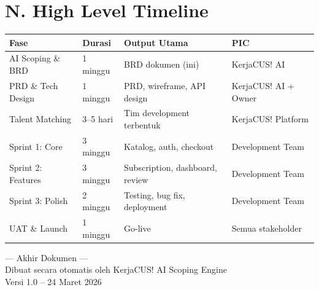 \documentclass[11pt,a4paper]{article}
\begin{document}
\section{N. High Level Timeline}
\noindent\small
\begin{tabularx}{\textwidth}{|p{3.2cm}|p{1.8cm}|X|p{2.8cm}|}
\hline
\centering\textbf{Fase}\arraybackslash & \centering\textbf{Durasi}\arraybackslash & \centering\textbf{Output Utama}\arraybackslash & \centering\textbf{PIC}\arraybackslash \\\hline
AI Scoping \& BRD & 1 minggu & BRD dokumen (ini) & KerjaCUS! AI \\\hline
PRD \& Tech Design & 1 minggu & PRD, wireframe, API design & KerjaCUS! AI + Owner \\\hline
Talent Matching & 3--5 hari & Tim development terbentuk & KerjaCUS! Platform \\\hline
Sprint 1: Core & 3 minggu & Katalog, auth, checkout & Development Team \\\hline
Sprint 2: Features & 3 minggu & Subscription, dashboard, review & Development Team \\\hline
Sprint 3: Polish & 2 minggu & Testing, bug fix, deployment & Development Team \\\hline
UAT \& Launch & 1 minggu & Go-live & Semua stakeholder \\\hline
\end{tabularx}\normalsize

\vspace{1.5cm}
\begin{center}\small
--- Akhir Dokumen ---\\
Dibuat secara otomatis oleh KerjaCUS! AI Scoping Engine\\
Versi 1.0 -- 24 Maret 2026
\end{center}
\end{document}
